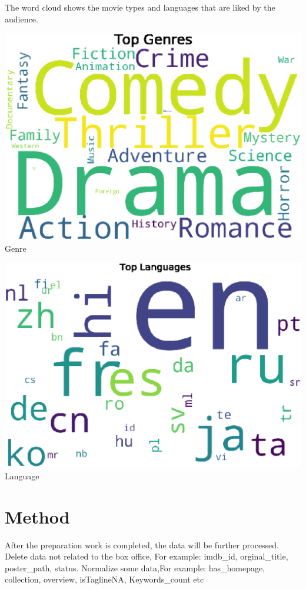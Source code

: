 The word cloud shows the movie types and languages that are liked by the audience.

\begin{center}
  \begin{minipage}{0.4\linewidth}
  \centering
    \includegraphics[width=0.8\linewidth]{figures//genre_clold.eps}\\
  {\small{Genre}}
  \end{minipage}
  \hfill
  \begin{minipage}{0.4\linewidth}
  \centering
    \includegraphics[width=0.8\linewidth]{figures//language.eps}\\
  {\small{Language}}
  \end{minipage}
  \hfill
\end{center}

\section{Method} \label{sec-method}
After the preparation work is completed, the data will be further processed. 
Delete data not related to the box office, For example: imdb_id, orginal_title, poster_path, status.
Normalize some data,For example: has_homepage, collection, overview, isTaglineNA, Keywords_count etc

